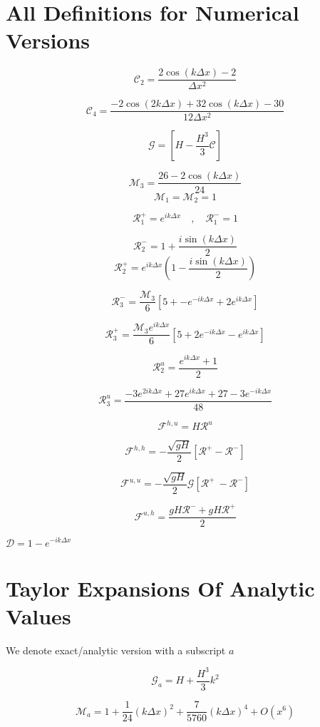 \documentclass[12pt]{article}
\begin{document}
\section{All Definitions for Numerical Versions}
\[\mathcal{C}_2 = \frac{ 2\cos\left(k\Delta x\right) - 2 }{\Delta x^2}\]

\[\mathcal{C}_4 = \frac{-2\cos\left(2k\Delta x\right) + 32\cos\left(k\Delta x\right)  - 30 }{12\Delta x^2}\]

\[\mathcal{G} = \left[H -\frac{H^3}{3} \mathcal{C}\right]\]

\[\mathcal{M}_3= \frac{26  -2\cos\left(k\Delta x\right)}{24}\]
\[\mathcal{M}_1 = \mathcal{M}_2 = 1\]

\[\mathcal{R}^+_1 =  e^{ik\Delta x} \quad , \quad\mathcal{R}^-_1 =  1\]

\[\mathcal{R}_2^- = 1  + \frac{i\sin\left(k\Delta x\right)}{2}\]
\[\mathcal{R}_2^+ = e^{ik\Delta x}\left(1  - \frac{i\sin\left(k\Delta x\right)}{2} \right)\]

\[\mathcal{R}_3^-= \frac{\mathcal{M}_3}{6}\left[5 +  - e^{-ik\Delta x} + 2e^{ik\Delta x} \right]\]

\[\mathcal{R}_3^+= \frac{\mathcal{M}_3 e^{ik\Delta x }}{6}\left[5 + 2e^{-ik\Delta x} - e^{ik\Delta x} \right]\] 

\[\mathcal{R}^u_2 = \frac{e^{ik\Delta x } + 1}{2} \]

\[\mathcal{R}^u_3 = \frac{-3e^{2ik\Delta x } + 27e^{ik\Delta x } + 27 - 3e^{-ik\Delta x }}{48}\]


\[\mathcal{F}^{h,u} = H\mathcal{R}^u\]

\[\mathcal{F}^{h,h} = -\dfrac{ \sqrt{gH}}{ 2} \left [ \mathcal{R}^+- \mathcal{R}^- \right ]\]

\[\mathcal{F}^{u,u} = - \dfrac{ \sqrt{gH}}{ 2} \mathcal{G} \left [ \mathcal{R}^+ \ -  \mathcal{R}^-  \right ]\]

\[\mathcal{F}^{u,h} = \dfrac{ gH \mathcal{R}^- + gH \mathcal{R}^+}{ 2}\]


$\mathcal{D} = 1 -e^{-ik\Delta x}$

\section{Taylor Expansions Of Analytic Values }
We denote exact/analytic version with a subscript $a$

\[\mathcal{G}_a = H + \frac{H^3}{3}k^2\]

\[\mathcal{M}_a = 1 + \frac{1}{24} (k\Delta x)^2 + \frac{7}{5760} (k\Delta x)^4 + O(x^{6}) \]
\end{document}
